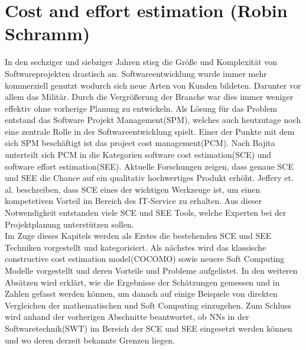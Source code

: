 \section{Cost and effort estimation (Robin Schramm)}
In den sechziger und siebziger Jahren stieg die Größe und Komplexität von Softwareprojekten drastisch an. Softwareentwicklung wurde immer mehr kommerziell genutzt wodurch sich neue Arten von Kunden bildeten. Darunter vor allem das Militär. Durch die Vergrößerung der Branche war dies immer weniger effektiv ohne vorherige Planung zu entwickeln. Als Lösung für das Problem entstand das Software Projekt Management(SPM), welches auch heutzutage noch eine zentrale Rolle in der Softwareentwicklung spielt.\cite{Bajta2018} Einer der Punkte mit dem sich SPM beschäftigt ist das project cost management(PCM). Nach Bajita\cite{Bajta2018} unterteilt sich PCM in die Kategorien software cost estimation(SCE) und software effort estimation(SEE). Aktuelle Forschungen zeigen, dass genaue SCE und SEE die Chance auf ein qualitativ hochwertiges Produkt erhöht.\cite{Matson1994}\cite{Bilgaiyan2016} Jeffery et. al. beschreiben, dass SCE eines der wichtigen Werkzeuge ist, um einen kompetetiven Vorteil im Bereich des IT-Service zu erhalten.\cite{Jeffery1990} Aus dieser Notwendigkeit entstanden viele SCE und SEE Tools, welche Experten bei der Projektplanung unterstützen sollen.
\\
Im Zuge dieses Kapitels werden als Erstes die bestehenden SCE und SEE Techniken vorgestellt und kategorisiert. Als nächstes wird das klassische constructive cost estimation model(COCOMO) sowie neuere Soft Computing Modelle vorgestellt und deren Vorteile und Probleme aufgelistet. In den weiteren Absätzen wird erklärt, wie die Ergebnisse der Schätzungen gemessen und in Zahlen  gefasst werden können, um danach auf einige Beispiele von direkten Vergleichen der mathematischen und Soft Computing einzugehen. Zum Schluss wird anhand der vorherigen Abschnitte beantwortet, ob NNs in der Softwaretechnik(SWT) im Bereich der SCE und SEE eingesetzt werden können und wo deren derzeit bekannte Grenzen liegen.

